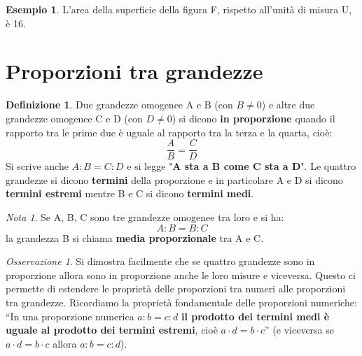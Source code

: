 \documentclass[a4paper,12pt]{article}
\theoremstyle{definition}
\newtheorem{defin}{Definizione}[section]
\newtheorem{esempio}{Esempio}[section]
\theoremstyle{remark}
\newtheorem{oss}{Osservazione}[section]
\newtheorem{nota}{Nota}[section]
\begin{document}
\begin{esempio}
L'area della superficie della figura F, rispetto all'unità di misura U, è 16.

\begin{center}
\end{center}
\end{esempio}

\newpage

\section*{Proporzioni tra grandezze}

\begin{defin}
Due grandezze omogenee A e B (con $B \neq 0$) e altre due grandezze omogenee C e D (con $D \neq 0$) si dicono \textbf{in proporzione} quando il rapporto tra le prime due è uguale al rapporto tra la terza e la quarta, cioè:
$$\frac{A}{B} = \frac{C}{D}$$
Si scrive anche $A:B = C:D$ e si legge "\textbf{A sta a B come C sta a D}".
Le quattro grandezze si dicono \textbf{termini} della proporzione e in particolare A e D si dicono \textbf{termini estremi} mentre B e C si dicono \textbf{termini medi}.
\end{defin}

\begin{nota}
Se A, B, C sono tre grandezze omogenee tra loro e si ha:
$$A:B = B:C$$
la grandezza B si chiama \textbf{media proporzionale} tra A e C.
\end{nota}

\begin{oss}
Si dimostra facilmente che se quattro grandezze sono in proporzione allora sono in proporzione anche le loro misure e viceversa.
Questo ci permette di estendere le proprietà delle proporzioni tra numeri alle proporzioni tra grandezze.
Ricordiamo la proprietà fondamentale delle proporzioni numeriche:
``In una proporzione numerica $a:b=c:d$ \textbf{il prodotto dei termini medi è uguale al prodotto dei termini estremi}, cioè $a \cdot d = b \cdot c$'' (e viceversa se $a \cdot d = b \cdot c$ allora $a:b=c:d$).
\end{oss}
\end{document}
